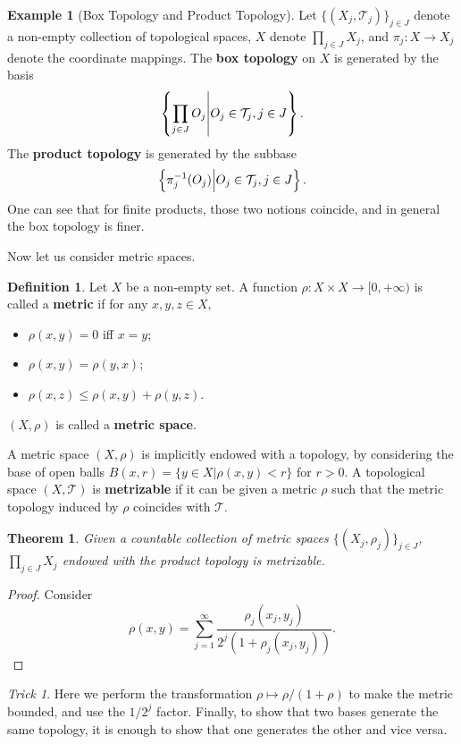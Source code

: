 \documentclass[openany]{book}
\newtheorem{theorem}{Theorem}[chapter]
\theoremstyle{definition}
\newtheorem{definition}{Definition}[chapter]
\newtheorem{example}{Example}[chapter]
\theoremstyle{remark}
\newtheorem*{trick}{Trick}
\begin{document}
\begin{example}[Box Topology and Product Topology]
    Let $\{(X_j,\mathcal{T}_j)\}_{j\in J}$ denote a non-empty collection of topological spaces, $X$ denote $\prod_{j\in J}X_j$, and $\pi_j:X\to X_j$ denote the coordinate mappings. The \textbf{box topology} on $X$ is generated by the basis
    \begin{equation*}
        \cbr{\prod_{j\in J}O_j\middle|O_j\in \mathcal{T}_j,j\in J}.
    \end{equation*}
    The \textbf{product topology} is generated by the subbase
    \begin{equation*}
        \cbr{\pi_j^{-1}(O_j)\middle|O_j\in \mathcal{T}_j,j\in J}.
    \end{equation*}
    One can see that for finite products, those two notions coincide, and in general the box topology is finer.
\end{example}

Now let us consider metric spaces.
\begin{definition}
    Let $X$ be a non-empty set. A function $\rho:X\times X\to[0,+\infty)$ is called a \textbf{metric} if for any $x,y,z\in X$,
    \begin{itemize}
        \item $\rho(x,y)=0$ iff $x=y$;
        \item $\rho(x,y)=\rho(y,x)$;
        \item $\rho(x,z)\le\rho(x,y)+\rho(y,z)$.
    \end{itemize}
    $(X,\rho)$ is called a \textbf{metric space}.
\end{definition}
A metric space $(X,\rho)$ is implicitly endowed with a topology, by considering the base of open balls $B(x,r)=\{y\in X|\rho(x,y)<r\}$ for $r>0$. A topological space $(X,\mathcal{T})$ is \textbf{metrizable} if it can be given a metric $\rho$ such that the metric topology induced by $\rho$ coincides with $\mathcal{T}$.
\begin{theorem}
    Given a countable collection of metric spaces $\{(X_j,\rho_j)\}_{j\in J}$, $\prod_{j\in J}X_j$ endowed with the product topology is metrizable.
\end{theorem}
\begin{proof}
    Consider
    \begin{equation}\label{eq:prodMetric}
        \rho(x,y)=\sum_{j=1}^{\infty}\frac{\rho_j(x_j,y_j)}{2^j(1+\rho_j(x_j,y_j))}.
    \end{equation}
\end{proof}
\begin{trick}
    Here we perform the transformation $\rho\mapsto\rho/(1+\rho)$ to make the metric bounded, and use the $1/2^j$ factor. Finally, to show that two bases generate the same topology, it is enough to show that one generates the other and vice versa.
\end{trick}
\end{document}

